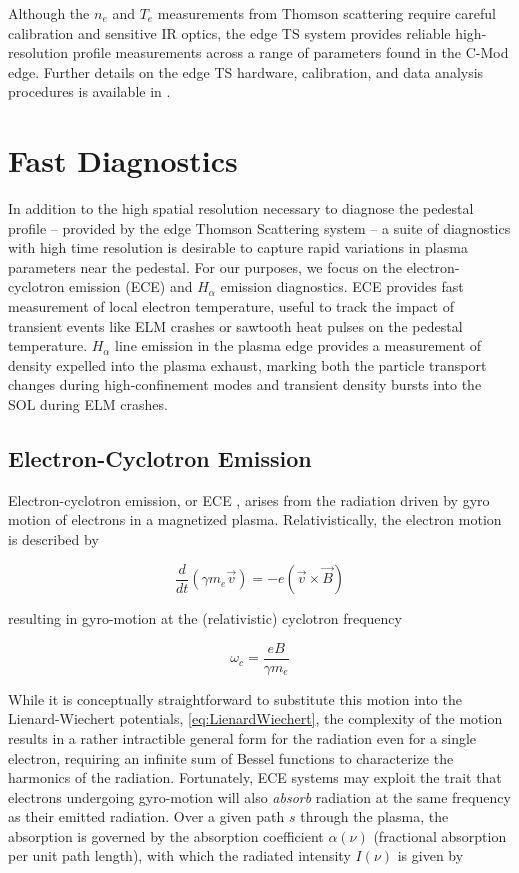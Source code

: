 Although the $n_e$ and $T_e$ measurements from Thomson scattering require careful calibration and sensitive IR optics, the edge TS system provides reliable high-resolution profile measurements across a range of parameters found in the C-Mod edge.  Further details on the edge TS hardware, calibration, and data analysis procedures is available in \cite[\S 3]{Hughes2005}.\nicesectionending

\section{Fast Diagnostics}\label{sec:app_fast}

In addition to the high spatial resolution necessary to diagnose the pedestal profile -- provided by the edge Thomson Scattering system -- a suite of diagnostics with high time resolution is desirable to capture rapid variations in plasma parameters near the pedestal.  For our purposes, we focus on the electron-cyclotron emission (ECE) and $H_\alpha$ emission diagnostics.  ECE provides fast measurement of local electron temperature, useful to track the impact of transient events like ELM crashes or sawtooth heat pulses on the pedestal temperature.  $H_\alpha$ line emission in the plasma edge provides a measurement of density expelled into the plasma exhaust, marking both the particle transport changes during high-confinement modes and transient density bursts into the SOL during ELM crashes.

\subsection{Electron-Cyclotron Emission}\label{subsec:app_ece}

Electron-cyclotron emission, or ECE \cite[\S 5.2]{Hutchinson}, arises from the radiation driven by gyro motion of electrons in a magnetized plasma.  Relativistically, the electron motion is described by

\begin{equation}
 \frac{d}{dt}\left(\gamma m_e \vec{v} \right) = -e\left(\vec{v} \times \vec{B} \right)
\end{equation}

\noindent resulting in gyro-motion at the (relativistic) cyclotron frequency

\begin{equation}
 \omega_c = \frac{eB}{\gamma m_e}
\end{equation}

While it is conceptually straightforward to substitute this motion into the Lienard-Wiechert potentials, \cref{eq:LienardWiechert}, the complexity of the motion results in a rather intractible general form for the radiation even for a single electron, requiring an infinite sum of Bessel functions to characterize the harmonics of the radiation.  Fortunately, ECE systems may exploit the trait that electrons undergoing gyro-motion will also \emph{absorb} radiation at the same frequency as their emitted radiation.  Over a given path $s$ through the plasma, the absorption is governed by the absorption coefficient $\alpha(\nu)$ (fractional absorption per unit path length), with which the radiated intensity $I(\nu)$ is given by

